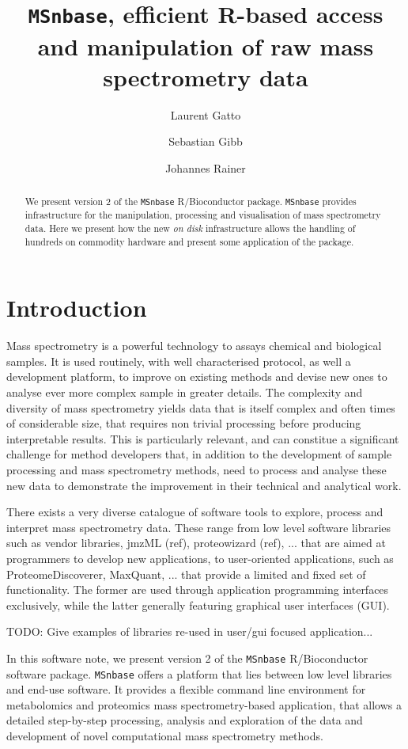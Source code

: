 \documentclass[journal=jacsat,manuscript=article]{achemso}\usepackage[]{graphicx}\usepackage[]{color}
\author{Laurent Gatto}
\affiliation[UCLouvain]{de Duve Institute, Universit\'e catholique de Louvain, Brussels, Belgium}
\author{Sebastian Gibb}
\affiliation[University of Greifswald]{Department of Anaesthesiology and Intensive Care of the University Medicine Greifswald, Germany}
\author{Johannes Rainer}
\affiliation[EURAC]{Institute for Biomedicine, Eurac Research, Affiliated Institute of the University of L\"ubeck, Bolzano, Italy}
\title[MSnbase version 2]
  {\texttt{MSnbase}, efficient R-based access and manipulation of raw mass spectrometry data}
\begin{document}

\begin{abstract} %
  We present version 2 of the \texttt{MSnbase} R/Bioconductor
  package. \texttt{MSnbase} provides infrastructure for the
  manipulation, processing and visualisation of mass spectrometry
  data. Here we present how the new \textit{on disk} infrastructure
  allows the handling of hundreds on commodity hardware and present
  some application of the package.
\end{abstract}


\section{Introduction}

Mass spectrometry is a powerful technology to assays chemical and
biological samples. It is used routinely, with well characterised
protocol, as well a development platform, to improve on existing
methods and devise new ones to analyse ever more complex sample in
greater details. The complexity and diversity of mass spectrometry
yields data that is itself complex and often times of considerable
size, that requires non trivial processing before producing
interpretable results. This is particularly relevant, and can
constitue a significant challenge for method developers that, in
addition to the development of sample processing and mass spectrometry
methods, need to process and analyse these new data to demonstrate the
improvement in their technical and analytical work.


There exists a very diverse catalogue of software tools to explore,
process and interpret mass spectrometry data. These range from low
level software libraries such as vendor libraries, jmzML (ref),
proteowizard (ref), ... that are aimed at programmers to develop new
applications, to user-oriented applications, such as
ProteomeDiscoverer, MaxQuant, ... that provide a limited and fixed set
of functionality. The former are used through application programming
interfaces exclusively, while the latter generally featuring graphical
user interfaces (GUI).

TODO: Give examples of libraries re-used in user/gui focused
application...


In this software note, we present version 2 of the \texttt{MSnbase}
\cite{Gatto:2012} R/Bioconductor software package. \texttt{MSnbase}
offers a platform that lies between low level libraries and end-use
software. It provides a flexible command line environment for
metabolomics and proteomics mass spectrometry-based application, that
allows a detailed step-by-step processing, analysis and exploration of
the data and development of novel computational mass spectrometry
methods.
\end{document}
